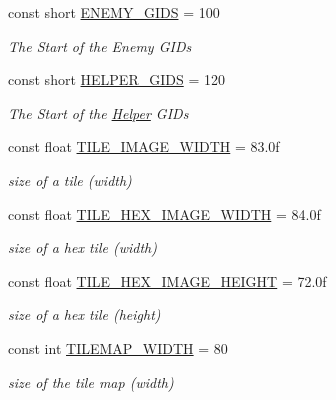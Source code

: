 \begin{DoxyCompactItemize}
const short \hyperlink{classClient_1_1Common_1_1Constants_1_1ClientConstants_a0f927a203a7e65984b85f98eed560cb7}{E\+N\+E\+M\+Y\+\_\+\+G\+I\+D\+S} = 100
\begin{DoxyCompactList}\small\item\em The Start of the Enemy G\+I\+Ds \end{DoxyCompactList}\item 
const short \hyperlink{classClient_1_1Common_1_1Constants_1_1ClientConstants_abdbce6edd33fb85723b04b8338fa9ba8}{H\+E\+L\+P\+E\+R\+\_\+\+G\+I\+D\+S} = 120
\begin{DoxyCompactList}\small\item\em The Start of the \hyperlink{namespaceClient_1_1Common_1_1Helper}{Helper} G\+I\+Ds \end{DoxyCompactList}\item 
const float \hyperlink{classClient_1_1Common_1_1Constants_1_1ClientConstants_a9d49a8c632eef590f3c5d6effdf27f8c}{T\+I\+L\+E\+\_\+\+I\+M\+A\+G\+E\+\_\+\+W\+I\+D\+T\+H} = 83.\+0f
\begin{DoxyCompactList}\small\item\em size of a tile (width) \end{DoxyCompactList}\item 
const float \hyperlink{classClient_1_1Common_1_1Constants_1_1ClientConstants_aceddac2a196bf10de9d0dcdf7530da12}{T\+I\+L\+E\+\_\+\+H\+E\+X\+\_\+\+I\+M\+A\+G\+E\+\_\+\+W\+I\+D\+T\+H} = 84.\+0f
\begin{DoxyCompactList}\small\item\em size of a hex tile (width) \end{DoxyCompactList}\item 
const float \hyperlink{classClient_1_1Common_1_1Constants_1_1ClientConstants_a92aac7f297a93b2a38522813930b79e7}{T\+I\+L\+E\+\_\+\+H\+E\+X\+\_\+\+I\+M\+A\+G\+E\+\_\+\+H\+E\+I\+G\+H\+T} = 72.\+0f
\begin{DoxyCompactList}\small\item\em size of a hex tile (height) \end{DoxyCompactList}\item 
const int \hyperlink{classClient_1_1Common_1_1Constants_1_1ClientConstants_aabf156b0d8e71e288662a145f33ed1a9}{T\+I\+L\+E\+M\+A\+P\+\_\+\+W\+I\+D\+T\+H} = 80
\begin{DoxyCompactList}\small\item\em size of the tile map (width) \end{DoxyCompactList}\item 

\end{DoxyCompactItemize}

